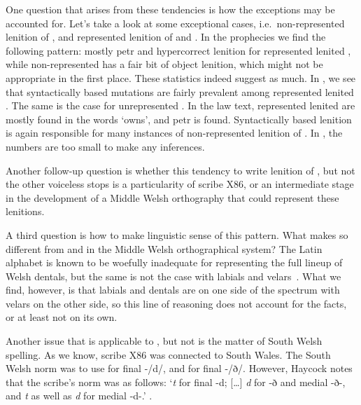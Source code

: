 One question that arises from these tendencies is how the exceptions may be accounted for. Let's take a look at some exceptional cases, i.e.\ non-represented lenition of , and represented lenition of  and .
In the prophecies we find the following pattern: mostly \gls{petr} and hypercorrect lenition for represented lenited , while non-represented  has a fair bit of object lenition, which might not be appropriate in the first place.
These statistics indeed suggest as much. In , we see that syntactically based mutations are fairly prevalent among represented lenited .  The same is the case for unrepresented . In the law text, represented lenited  are mostly found in the words  `owns', and \gls{petr} is found. Syntactically based lenition is again responsible for many instances of non-represented lenition of . In , the numbers are too small to make any inferences.

Another follow-up question is whether this tendency to write lenition of , but not the other voiceless stops is a particularity of scribe X86, or an intermediate stage in the development of a Middle Welsh orthography that could represent these lenitions. 

A third question is how to make linguistic sense of this pattern. What makes  so different from  and  in the Middle Welsh orthographical system? The Latin alphabet is known to be woefully inadequate for representing the full lineup of Welsh dentals, but the same is not the case with labials and velars~\autocite{russell_rowynniauc_2003}. What we find, however, is that labials and dentals are on one side of the spectrum with velars on the other side, so this line of reasoning does not account for the facts, or at least not on its own.  

Another issue that is applicable to , but not  is the matter of South Welsh spelling. As we know, scribe X86 was connected to South Wales. The South Welsh norm was to use  for final -/d/, and  for final -/ð/. However, Haycock notes that the scribe's norm was as follows: `\textit{t} for final -d; [\dots] \textit{d} for -ð and medial -ð-, and \textit{t} as well as \textit{d} for medial -d-.' \autocite[p.~7, n.~18]{haycock_legendary_2015}. 




